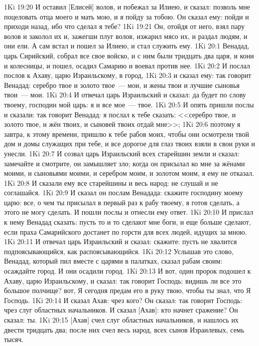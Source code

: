 \vs 1Ki 19:20 И оставил [Елисей] волов, и побежал за Илиею, и сказал: позволь мне поцеловать отца моего и мать мою, и я пойду за тобою. Он сказал ему: пойди и приходи назад, ибо что сделал я тебе?
\vs 1Ki 19:21 Он, отойдя от него, взял пару волов и заколол их и, зажегши плуг волов, изжарил мясо их, и раздал людям, и они ели. А сам встал и пошел за Илиею, и стал служить ему.
\vs 1Ki 20:1 Венадад, царь Сирийский, собрал все свое войско, и с ним были тридцать два царя, и кони и колесницы, и пошел, осадил Самарию и воевал против нее.
\vs 1Ki 20:2 И послал послов к Ахаву, царю Израильскому, в город,
\vs 1Ki 20:3 и сказал ему: так говорит Венадад: серебро твое и золото твое~--- мои, и жены твои и лучшие сыновья твои~--- мои.
\vs 1Ki 20:4 И отвечал царь Израильский и сказал: да будет по слову твоему, господин мой царь: я и все мое~--- твое.
\vs 1Ki 20:5 И опять пришли послы и сказали: так говорит Венадад: я послал к тебе сказать: <<серебро твое, и золото твое, и жён твоих, и сыновей твоих отдай мне>>;
\vs 1Ki 20:6 поэтому я завтра, к этому времени, пришлю к тебе рабов моих, чтобы они осмотрели твой дом и домы служащих при тебе, и все дорогое для глаз твоих взяли в свои руки и унесли.
\vs 1Ki 20:7 И созвал царь Израильский всех старейшин земли и сказал: замечайте и смотрите, он замышляет зло; когда он присылал ко мне за жёнами моими, и сыновьями моими, и серебром моим, и золотом моим, я ему не отказал.
\vs 1Ki 20:8 И сказали ему все старейшины и весь народ: не слушай и не соглашайся.
\vs 1Ki 20:9 И сказал он послам Венадада: скажите господину моему царю: все, о чем ты присылал в первый раз к рабу твоему, я готов сделать, а этого не могу сделать. И пошли послы и отнесли ему ответ.
\vs 1Ki 20:10 И прислал к нему Венадад сказать: пусть то и то сделают мне боги, и еще больше сделают, если праха Самарийского достанет по горсти для всех людей, идущих за мною.
\vs 1Ki 20:11 И отвечал царь Израильский и сказал: скажите: пусть не хвалится подпоясывающийся, как распоясывающийся.
\vs 1Ki 20:12 Услышав это слово, Венадад, который пил вместе с царями в палатках, сказал рабам своим: осаждайте город. И они осадили город.
\rsbpar\vs 1Ki 20:13 И вот, один пророк подошел к Ахаву, царю Израильскому, и сказал: так говорит Господь: видишь ли все это большое полчище? вот, Я сегодня предам его в руку твою, чтобы ты знал, что Я Господь.
\vs 1Ki 20:14 И сказал Ахав: чрез кого? Он сказал: так говорит Господь: чрез слуг областных начальников. И сказал [Ахав]: кто начнет сражение? Он сказал: ты.
\vs 1Ki 20:15 [Ахав] счел слуг областных начальников, и нашлось их двести тридцать два; после них счел весь народ, всех сынов Израилевых, семь тысяч.
